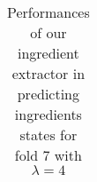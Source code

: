 \documentclass{article}
\begin{document}
\begin{table}
\begin{center}
\begin{tabular}{| l | l | l | l | l | l | l | l | l |}
    \end{tabular}
    \label{tab:tab10}
\end{center}
\caption{Performances of our ingredient extractor in predicting ingredients states for fold 7 with $\lambda = 4$}
\end{table}
\end{document}
